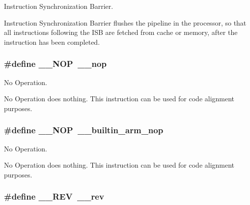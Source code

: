 Instruction Synchronization Barrier. 

Instruction Synchronization Barrier flushes the pipeline in the processor, so that all instructions following the I\-S\-B are fetched from cache or memory, after the instruction has been completed. \hypertarget{group___c_m_s_i_s___core___instruction_interface_gabd585ddc865fb9b7f2493af1eee1a572}{
\subsubsection[{\-\_\-\-\_\-\-N\-O\-P}]{\setlength{\rightskip}{0pt plus 5cm}\#define \-\_\-\-\_\-\-N\-O\-P~\-\_\-\-\_\-nop}}\label{group___c_m_s_i_s___core___instruction_interface_gabd585ddc865fb9b7f2493af1eee1a572}


No Operation. 

No Operation does nothing. This instruction can be used for code alignment purposes. \hypertarget{group___c_m_s_i_s___core___instruction_interface_gabd585ddc865fb9b7f2493af1eee1a572}{
\subsubsection[{\-\_\-\-\_\-\-N\-O\-P}]{\setlength{\rightskip}{0pt plus 5cm}\#define \-\_\-\-\_\-\-N\-O\-P~\-\_\-\-\_\-builtin\-\_\-arm\-\_\-nop}}\label{group___c_m_s_i_s___core___instruction_interface_gabd585ddc865fb9b7f2493af1eee1a572}


No Operation. 

No Operation does nothing. This instruction can be used for code alignment purposes. \hypertarget{group___c_m_s_i_s___core___instruction_interface_ga14f54807872c0f5e05604c4924abfdae}{
\subsubsection[{\-\_\-\-\_\-\-R\-E\-V}]{\setlength{\rightskip}{0pt plus 5cm}\#define \-\_\-\-\_\-\-R\-E\-V~\-\_\-\-\_\-rev}}\label{group___c_m_s_i_s___core___instruction_interface_ga14f54807872c0f5e05604c4924abfdae}


